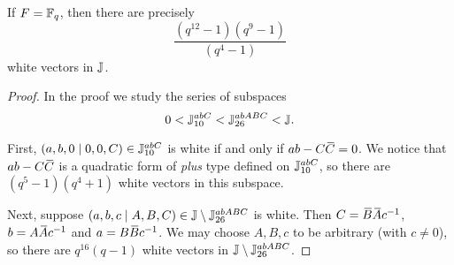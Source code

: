 \begin{theorem}
	\label{theorem:white_points_count}
	If $F = \mathbb{F}_q$, then there are precisely
	\begin{equation}
		\frac{(q^{12}-1) (q^9-1)}{(q^4-1)} 
	\end{equation}
	white vectors in $\mathbb{J}$. 
\end{theorem}

\begin{proof}
	In the proof we study the series of subspaces
	\begin{equation*}
		0 < \mathbb{J}_{10}^{abC} < \mathbb{J}_{26}^{abABC} < \mathbb{J}.
	\end{equation*}
	
	First, $(a,b,0\mid 0,0,C) \in \mathbb{J}_{10}^{abC}$ is white if and only if 
	$ab - C\mathord{\mbox{\hspace*{0pt}}\,\overline{\!C\!\!\;}\!\:}\mbox{\hspace*{0pt}} = 0$. We notice that $ab - C\mathord{\mbox{\hspace*{0pt}}\,\overline{\!C\!\!\;}\!\:}\mbox{\hspace*{0pt}}$ is a quadratic form of 
	\textit{plus} type defined on $\mathbb{J}_{10}^{abC}$, so there are
	$(q^5-1)(q^4+1)$ white vectors in this subspace. 
	
	Next, suppose $(a,b,c\mid A,B,C) \in \mathbb{J}\setminus \mathbb{J}_{26}^{abABC}$ is white. 
	Then $C = \ovB \ovA c^{-1}$, $b = A\mathord{\mbox{\hspace*{0pt}}\,\overline{\!A\!\!\;}\!\:}\mbox{\hspace*{0pt}} c^{-1}$ and $a = B\mathord{\mbox{\hspace*{0pt}}\,\overline{\!B\!\!\;}\!\:}\mbox{\hspace*{0pt}} c^{-1}$.
	We may choose $A,B,c$ to be arbitrary (with $c \neq 0$), so there are 
	$q^{16}(q-1)$ white vectors in $\mathbb{J}\setminus\mathbb{J}_{26}^{abABC}$.
	

\end{proof}
